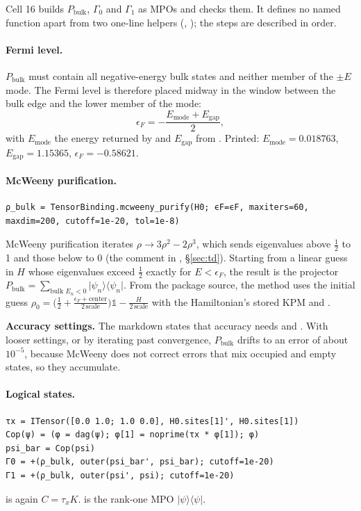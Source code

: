 \documentclass[11pt]{article}
\newcommand{\ket}[1]{\lvert #1\rangle}
\newcommand{\bra}[1]{\langle #1\rvert}
\begin{document}
Cell 16 builds $P_{\text{bulk}}$, $\Gamma_0$ and $\Gamma_1$ as MPOs and checks them. It defines no named function
apart from two one-line helpers (, ); the steps are described in order.

\paragraph{Fermi level.} $P_{\text{bulk}}$ must contain all negative-energy bulk states and neither member of the
$\pm E$ mode. The Fermi level is therefore placed midway in the window between the bulk edge and the lower member of
the mode:
\[
  \epsilon_F = -\frac{E_{\text{mode}} + E_{\text{gap}}}{2},
\]
with $E_{\text{mode}}$ the energy returned by  and $E_{\text{gap}}$ from . Printed:
$E_{\text{mode}}=0.018763$, $E_{\text{gap}}=1.15365$, $\epsilon_F=-0.58621$.

\paragraph{McWeeny purification.}
\begin{Verbatim}
ρ_bulk = TensorBinding.mcweeny_purify(H0; ϵF=ϵF, maxiters=60, maxdim=200, cutoff=1e-20, tol=1e-8)
\end{Verbatim}
McWeeny purification iterates $\rho\to3\rho^2-2\rho^3$, which sends eigenvalues above $\tfrac12$ to 1 and those below
to 0 (the comment in , \S\ref{sec:td}). Starting from a linear guess in $H$ whose eigenvalues
exceed $\tfrac12$ exactly for $E<\epsilon_F$, the result is the projector
$P_{\text{bulk}}=\sum_{\text{bulk }E_n<0}\ket{\psi_n}\bra{\psi_n}$. From the package source, the
 method uses the initial guess
$\rho_0 = \bigl(\tfrac12 + \tfrac{\epsilon_F+\text{center}}{2\,\text{scale}}\bigr)\mathbb 1 - \tfrac{H}{2\,\text{scale}}$
with the Hamiltonian's stored KPM  and .

\textbf{Accuracy settings.} The markdown states that accuracy needs  and . With
looser settings, or by iterating past convergence, $P_{\text{bulk}}$ drifts to an error of about $10^{-5}$, because
McWeeny does not correct errors that mix occupied and empty states, so they accumulate.

\paragraph{Logical states.}
\begin{Verbatim}
τx = ITensor([0.0 1.0; 1.0 0.0], H0.sites[1]', H0.sites[1])
Cop(ψ) = (φ = dag(ψ); φ[1] = noprime(τx * φ[1]); φ)
psi_bar = Cop(psi)
Γ0 = +(ρ_bulk, outer(psi_bar', psi_bar); cutoff=1e-20)
Γ1 = +(ρ_bulk, outer(psi', psi); cutoff=1e-20)
\end{Verbatim}
 is again $C=\tau_xK$.  is the rank-one MPO $\ket{\psi}\bra{\psi}$.
\end{document}
